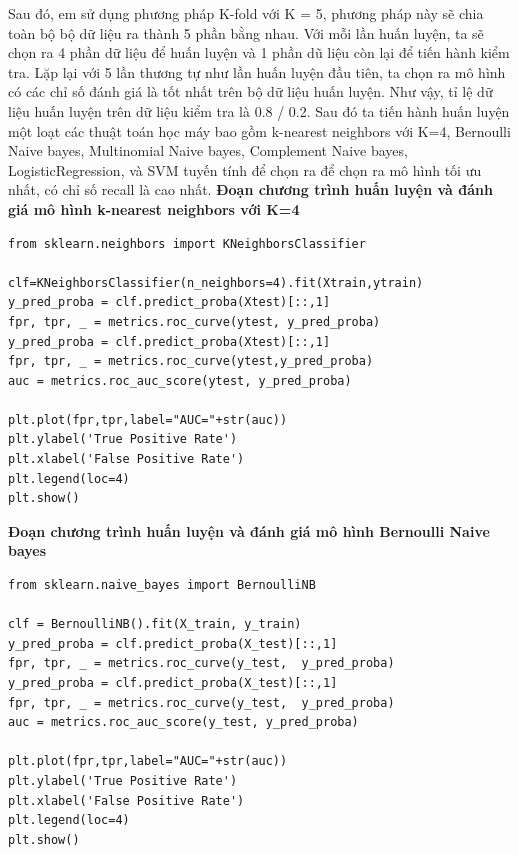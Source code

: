 \documentclass[../DoAn.tex]{subfiles}
\begin{document}
Sau đó, em sử dụng phương pháp K-fold với K = 5, 
phương pháp này sẽ chia toàn bộ bộ dữ liệu ra thành 5 phần bằng nhau. Với mỗi lần huấn luyện, ta sẽ chọn ra 4 phần dữ liệu để huấn luyện và 1 phần dũ liệu còn lại để tiến hành kiểm tra. Lặp lại với 5 lần thương tự như lần huấn luyện đầu tiên, ta chọn ra mô hình có các chỉ số đánh giá là tốt nhất trên bộ dữ liệu huấn luyện. Như vậy, tỉ lệ dữ liệu huấn luyện trên dữ liệu kiểm tra là 0.8 / 0.2. Sau đó ta tiến hành huấn luyện một loạt các thuật toán học máy bao gồm k-nearest neighbors với K=4, Bernoulli Naive bayes, Multinomial Naive bayes, Complement Naive bayes, LogisticRegression, và SVM tuyến tính để chọn ra để chọn ra mô hình tối ưu nhất, có chỉ số recall là cao nhất. 
\textbf{Đoạn chương trình huấn luyện và đánh giá mô hình k-nearest neighbors với K=4}
\begin{lstlisting}
from sklearn.neighbors import KNeighborsClassifier

clf=KNeighborsClassifier(n_neighbors=4).fit(Xtrain,ytrain)
y_pred_proba = clf.predict_proba(Xtest)[::,1]
fpr, tpr, _ = metrics.roc_curve(ytest, y_pred_proba)
y_pred_proba = clf.predict_proba(Xtest)[::,1]
fpr, tpr, _ = metrics.roc_curve(ytest,y_pred_proba)
auc = metrics.roc_auc_score(ytest, y_pred_proba)

plt.plot(fpr,tpr,label="AUC="+str(auc))
plt.ylabel('True Positive Rate')
plt.xlabel('False Positive Rate')
plt.legend(loc=4)
plt.show()
\end{lstlisting}
\textbf{Đoạn chương trình huấn luyện và đánh giá mô hình Bernoulli Naive bayes}
\begin{lstlisting}
from sklearn.naive_bayes import BernoulliNB

clf = BernoulliNB().fit(X_train, y_train)
y_pred_proba = clf.predict_proba(X_test)[::,1]
fpr, tpr, _ = metrics.roc_curve(y_test,  y_pred_proba)
y_pred_proba = clf.predict_proba(X_test)[::,1]
fpr, tpr, _ = metrics.roc_curve(y_test,  y_pred_proba)
auc = metrics.roc_auc_score(y_test, y_pred_proba)

plt.plot(fpr,tpr,label="AUC="+str(auc))
plt.ylabel('True Positive Rate')
plt.xlabel('False Positive Rate')
plt.legend(loc=4)
plt.show()
\end{lstlisting}
\end{document}

